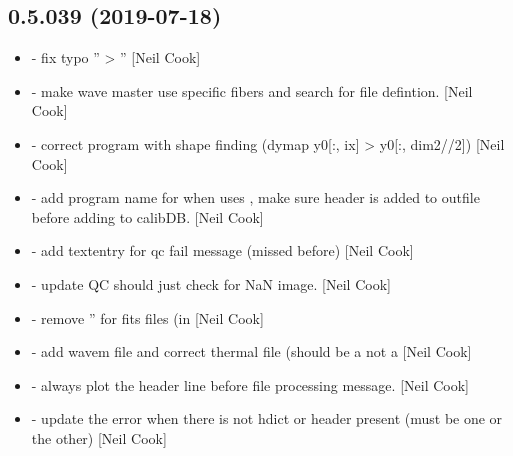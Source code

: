 \documentclass[a4paper,10pt,english]{report}
\begin{document}
\subsection{0.5.039 (2019-07-18)}
\label{\detokenize{misc/changelog:id103}}\begin{itemize}
\item {} 
 - fix typo ” \textendash{}\textgreater{} ” {[}Neil
Cook{]}

\item {} 
 - make wave master use specific fibers and search for file
defintion. {[}Neil Cook{]}

\item {} 
 - correct program with shape finding (dymap y0{[}:, ix{]} \textendash{}\textgreater{}
y0{[}:, dim2//2{]}) {[}Neil Cook{]}

\item {} 
 - add program name for when  uses
 , make sure header is added to outfile
before adding to calibDB. {[}Neil Cook{]}

\item {} 
 - add textentry for qc fail message (missed before)
{[}Neil Cook{]}

\item {} 
 - update QC should just check for NaN image.
{[}Neil Cook{]}

\item {} 
 - remove ” for fits files (in 
{[}Neil Cook{]}

\item {} 
 - add wavem file and correct thermal file (should
be a  not a  {[}Neil Cook{]}

\item {} 
 - always plot the header line before file processing
message. {[}Neil Cook{]}

\item {} 
 - update the error when there is not hdict or header
present (must be one or the other) {[}Neil Cook{]}


\end{itemize}
\end{document}

